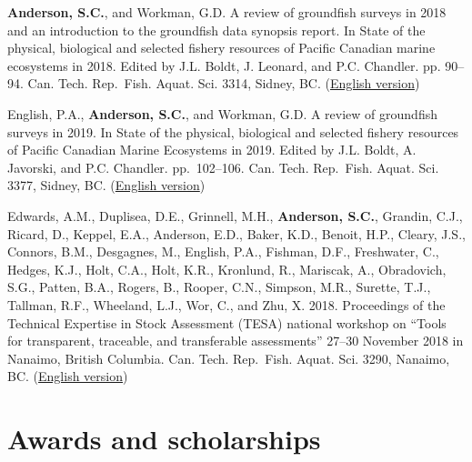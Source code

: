 \begin{description}
\tightlist
\item[2019]
\textbf{Anderson, S.C.}, and Workman, G.D. A review of groundfish
surveys in 2018 and an introduction to the groundfish data synopsis
report. In State of the physical, biological and selected fishery
resources of Pacific Canadian marine ecosystems in 2018. Edited by J.L.
Boldt, J. Leonard, and P.C. Chandler. pp. 90--94. Can. Tech. Rep.\ Fish.
Aquat. Sci. 3314, Sidney, BC.
(\href{https://www.dfo-mpo.gc.ca/oceans/publications/soto-rceo/2018/index-eng.html}{English
version})
\item[2020]
English, P.A., \textbf{Anderson, S.C.}, and Workman, G.D. A review of
groundfish surveys in 2019. In State of the physical, biological and
selected fishery resources of Pacific Canadian Marine Ecosystems in
2019. Edited by J.L. Boldt, A. Javorski, and P.C. Chandler.
pp.\ 102--106. Can. Tech. Rep.\ Fish. Aquat. Sci. 3377, Sidney, BC.
(\href{https://www.dfo-mpo.gc.ca/oceans/publications/soto-rceo/2019/index-eng.html}{English
version})
\item[2018]
Edwards, A.M., Duplisea, D.E., Grinnell, M.H., \textbf{Anderson, S.C.},
Grandin, C.J., Ricard, D., Keppel, E.A., Anderson, E.D., Baker, K.D.,
Benoit, H.P., Cleary, J.S., Connors, B.M., Desgagnes, M., English, P.A.,
Fishman, D.F., Freshwater, C., Hedges, K.J., Holt, C.A., Holt, K.R.,
Kronlund, R., Mariscak, A., Obradovich, S.G., Patten, B.A., Rogers, B.,
Rooper, C.N., Simpson, M.R., Surette, T.J., Tallman, R.F., Wheeland,
L.J., Wor, C., and Zhu, X. 2018. Proceedings of the Technical Expertise
in Stock Assessment (TESA) national workshop on ``Tools for transparent,
traceable, and transferable assessments'' 27--30 November 2018 in
Nanaimo, British Columbia. Can. Tech. Rep.\ Fish. Aquat. Sci. 3290,
Nanaimo, BC.
(\href{https://waves-vagues.dfo-mpo.gc.ca/Library/40750152.pdf}{English
version})
\end{description}

\hypertarget{awards-and-scholarships}{%
\section{Awards and scholarships}\label{awards-and-scholarships}}


